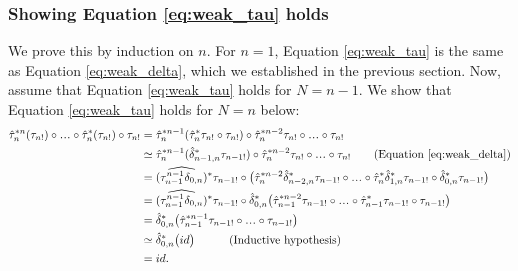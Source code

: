 \subsubsection{Showing Equation \ref{eq:weak_tau} holds}
We prove this by induction on $n$. For $n=1$, 
Equation \ref{eq:weak_tau} is the same as 
Equation \ref{eq:weak_delta}, which we 
established in the previous section. Now, 
assume that Equation \ref{eq:weak_tau} holds 
for $N=n-1$. We show that Equation 
\ref{eq:weak_tau} holds for $N=n$ below:
\begin{align*}
\hat{\tau}_n^{*n}(\tau_{n!}) \circ \smdots 
  \circ \hat{\tau}_n^*(\tau_{n!}) \circ \tau_{n!}
&= 
\hat{\tau}_n^{*n-1}(
  \hat{\tau}_n^*\tau_{n!}\circ \tau_{n!}) \circ
  \hat{\tau}_n^{*n-2}\tau_{n!}\circ
  \smdots \circ \tau_{n!}\\
&\simeq 
\hat{\tau}_n^{*n-1}(
  \hat{\delta}_{n-1,n}^*\tau_{n-1!}) \circ
  \hat{\tau}_n^{*n-2}\tau_{n!}\circ
  \smdots \circ \tau_{n!}
  \quad \quad \textrm{(Equation \ref{eq:weak_delta})}\\ 
&= 
(\widehat{\tau_{n-1}^{n-1}\delta_{0,n}})^*
  \tau_{n-1!} \circ \big(
  \hat{\tau}_n^{*n-2} \hat{\delta}_{n-2,n}^*
  \tau_{n-1!}\circ \smdots \circ 
  \hat{\tau}_n^* \hat{\delta}_{1,n}^* \tau_{n-1!} 
  \circ \hat{\delta}_{0,n}^* \tau_{n-1!} 
  \big)\\
&= 
(\widehat{\tau_{n-1}^{n-1}\delta_{0,n}})^*
  \tau_{n-1!} \circ \hat{\delta}_{0,n}^* \big(
  \hat{\tau}_{n-1}^{*n-2} \tau_{n-1!}\circ \smdots \circ 
  \hat{\tau}_{n-1}^* \tau_{n-1!} 
  \circ \tau_{n-1!} \big)  \\
&= 
\hat{\delta}_{0,n}^* \big(
  \hat{\tau}_{n-1}^{*n-1} \tau_{n-1!} \circ 
  \smdots \circ \tau_{n-1!} \big)  \\ 
&\simeq 
\hat{\delta}_{0,n}^* \big(
  id \big)
  \quad \quad \quad 
  \textrm{(Inductive hypothesis)}\\
&= id.
\end{align*}
%
